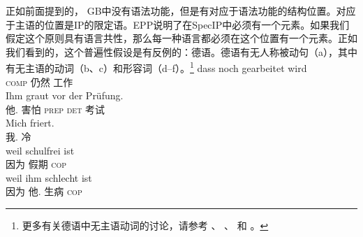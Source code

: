 正如前面提到的， GB中没有语法功能，但是有对应于语法功能的结构位置。对应于主语的位置是IP的限定语。EPP说明了在SpecIP中必须有一个元素。如果我们假定这个原则具有语言共性，那么每一种语言都必须在这个位置有一个元素。正如我们看到的，这个普遍性假设是有反例的：德语。德语有无人称被动句（a），其中有无主语的动词（b、c）和形容词（d--f）。\footnote{%
	更多有关德语中无主语动词的讨论，请参考 、 、
    和 。
}
\eal
\ex 
\gll dass noch gearbeitet wird\\
	 \textsc{comp} 仍然 工作 \passiveprs{}\\
\ex 
\gll Ihm graut vor der Prüfung.\\
     他.\dat{} 害怕 \textsc{prep} \textsc{det} 考试\\
\ex 
\gll Mich friert.\\
	 我.\acc{} 冷\\
\ex\label{ex-schulfrei}
\gll weil schulfrei ist\\
	 因为 假期 \textsc{cop}\\
\ex\label{ex-schlecht-ist}
\gll weil ihm schlecht ist\\
	 因为 他.\dat{} 生病 \textsc{cop}\\
